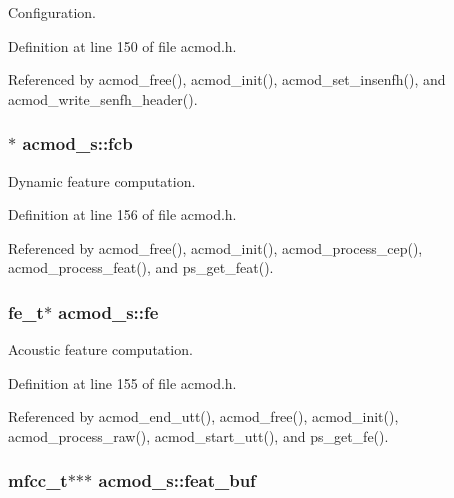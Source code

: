 Configuration. 



Definition at line 150 of file acmod.\-h.



Referenced by acmod\-\_\-free(), acmod\-\_\-init(), acmod\-\_\-set\-\_\-insenfh(), and acmod\-\_\-write\-\_\-senfh\-\_\-header().

\subsubsection[{fcb}]{$\ast$ acmod\-\_\-s\-::fcb}\label{structacmod__s_a37ec6c2b1f3ada764842e08481239b34}


Dynamic feature computation. 



Definition at line 156 of file acmod.\-h.



Referenced by acmod\-\_\-free(), acmod\-\_\-init(), acmod\-\_\-process\-\_\-cep(), acmod\-\_\-process\-\_\-feat(), and ps\-\_\-get\-\_\-feat().

\subsubsection[{fe}]{\setlength{\rightskip}{0pt plus 5cm}fe\-\_\-t$\ast$ acmod\-\_\-s\-::fe}\label{structacmod__s_a56eaceb9b6a1cbcccd09cf42cfa87231}


Acoustic feature computation. 



Definition at line 155 of file acmod.\-h.



Referenced by acmod\-\_\-end\-\_\-utt(), acmod\-\_\-free(), acmod\-\_\-init(), acmod\-\_\-process\-\_\-raw(), acmod\-\_\-start\-\_\-utt(), and ps\-\_\-get\-\_\-fe().

\subsubsection[{feat\-\_\-buf}]{\setlength{\rightskip}{0pt plus 5cm}mfcc\-\_\-t$\ast$$\ast$$\ast$ acmod\-\_\-s\-::feat\-\_\-buf}\label{structacmod__s_afc52cc0151f6c7e32a230576141d20a3}



